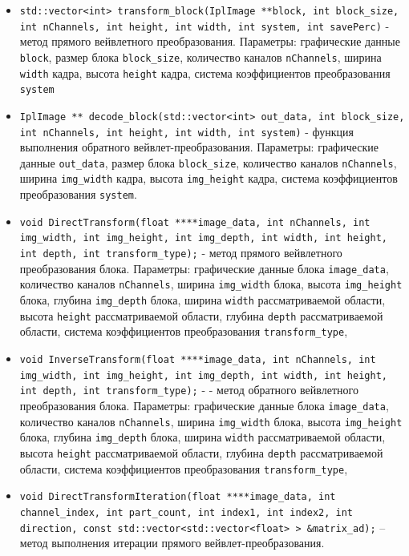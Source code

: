 \begin{itemize}
 \item \texttt{std::vector<int> transform\_block(IplImage **block, int block\_size, int nChannels, int height, int width, int system, int savePerc)} - 
 метод прямого вейвлетного преобразования. Параметры: графические данные \texttt{block}, размер блока \texttt{block\_size}, 
 количество каналов \texttt{nChannels}, ширина \texttt{width} кадра, 
высота \texttt{height} кадра, система коэффициентов преобразования \texttt{system}
 \item \texttt{IplImage ** decode\_block(std::vector<int> out\_data, int block\_size, int nChannels, int height, int width, int system)} - 
 функция выполнения обратного вейвлет-преобразования.
 Параметры: графические данные \texttt{out\_data}, размер блока \texttt{block\_size}, количество каналов \texttt{nChannels}, ширина \texttt{img\_width} кадра, 
 высота \texttt{img\_height} кадра, система коэффициентов преобразования \texttt{system}.
 \item \texttt{void DirectTransform(float ****image\_data, int nChannels, int img\_width, int img\_height, int img\_depth, 
 int width, int height, int depth, int transform\_type);} 
 - метод прямого вейвлетного преобразования блока. Параметры:
 графические данные блока \texttt{image\_data}, количество каналов \texttt{nChannels}, ширина \texttt{img\_width} блока, 
высота \texttt{img\_height} блока, глубина \texttt{img\_depth} блока, ширина \texttt{width} рассматриваемой области, 
высота \texttt{height} рассматриваемой области, глубина \texttt{depth} рассматриваемой области, система коэффициентов преобразования \texttt{transform\_type},
 \item \texttt{void InverseTransform(float ****image\_data, int nChannels, int img\_width, int img\_height, int img\_depth, 
 int width, int height, int depth, int transform\_type);} - 
 - метод обратного вейвлетного преобразования блока. Параметры:
 графические данные блока \texttt{image\_data}, количество каналов \texttt{nChannels}, ширина \texttt{img\_width} блока, 
высота \texttt{img\_height} блока, глубина \texttt{img\_depth} блока, ширина \texttt{width} рассматриваемой области, 
высота \texttt{height} рассматриваемой области, глубина \texttt{depth} рассматриваемой области, система коэффициентов преобразования \texttt{transform\_type},
 \item \texttt{void DirectTransformIteration(float ****image\_data, 
 int channel\_index, int part\_count, int index1, int index2, 
 int direction, const std::vector<std::vector<float> > \&matrix\_ad);} – метод выполнения итерации прямого вейвлет-преобразования. 

\end{itemize}
